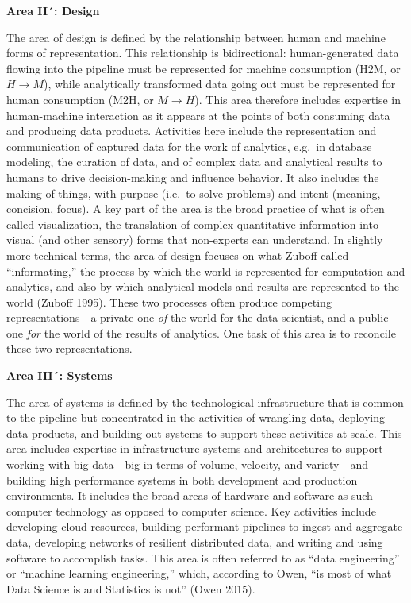 \documentclass[
  letterpaper,
]{report}
\begin{document}
\textbf{Area II´: Design}

The area of design is defined by the relationship between human and
machine forms of representation. This relationship is bidirectional:
human-generated data flowing into the pipeline must be represented for
machine consumption (H2M, or \(H \rightarrow M\)), while analytically
transformed data going out must be represented for human consumption
(M2H, or \(M \rightarrow H\)). This area therefore includes expertise in
human-machine interaction as it appears at the points of both consuming
data and producing data products. Activities here include the
representation and communication of captured data for the work of
analytics, e.g.~in database modeling, the curation of data, and of
complex data and analytical results to humans to drive decision-making
and influence behavior. It also includes the making of things, with
purpose (i.e.~to solve problems) and intent (meaning, concision, focus).
A key part of the area is the broad practice of what is often called
visualization, the translation of complex quantitative information into
visual (and other sensory) forms that non-experts can understand. In
slightly more technical terms, the area of design focuses on what Zuboff
called ``informating,'' the process by which the world is represented
for computation and analytics, and also by which analytical models and
results are represented to the world (Zuboff 1995). These two processes
often produce competing representations---a private one \emph{of} the
world for the data scientist, and a public one \emph{for} the world of
the results of analytics. One task of this area is to reconcile these
two representations.

\textbf{Area III´: Systems}

The area of systems is defined by the technological infrastructure that
is common to the pipeline but concentrated in the activities of
wrangling data, deploying data products, and building out systems to
support these activities at scale. This area includes expertise in
infrastructure systems and architectures to support working with big
data---big in terms of volume, velocity, and variety---and building high
performance systems in both development and production environments. It
includes the broad areas of hardware and software as such---computer
technology as opposed to computer science. Key activities include
developing cloud resources, building performant pipelines to ingest and
aggregate data, developing networks of resilient distributed data, and
writing and using software to accomplish tasks. This area is often
referred to as ``data engineering'' or ``machine learning engineering,''
which, according to Owen, ``is most of what Data Science is and
Statistics is not'' (Owen 2015).
\end{document}

